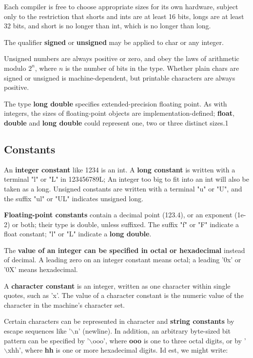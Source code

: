 \documentclass{article}
\begin{document}
Each compiler is free to choose appropriate sizes for its own hardware, subject only to the restriction that shorts and ints are at least 16 bits, longs are at least 32 bits, and short is no longer than int, which is no longer than long.

The qualifier \textbf{signed} or \textbf{unsigned} may be applied to char or any integer.

Unsigned numbers are always positive or zero, and obey the laws of arithmetic modulo $2^n$, where $n$ is the number of bits in the type. Whether plain chars are signed or unsigned is machine-dependent, but printable characters are always positive.

The type \textbf{long double} specifies extended-precision floating point. As with integers, the sizes of floating-point objects are implementation-defined; \textbf{float}, \textbf{double} and \textbf{long double} could represent one, two or three distinct sizes.1

\clearpage
\subsection{Constants}

An \textbf{integer constant} like 1234 is an int. 
A \textbf{long constant} is written with a terminal "l" or "L" in 123456789L; An integer too big to fit into an int will also be taken as a long. Unsigned constants are written with a terminal "u" or "U", and the suffix "ul" or "UL" indicates unsigned long.

\textbf{Floating-point constants} contain a decimal point (123.4), or an exponent (1e-2) or both; their type is double, unless suffixed. The suffix "f" or "F" indicate a float constant; "l" or "L" indicate a \textbf{long double}.

The \textbf{value of an integer can be specified in octal or hexadecimal} instead of decimal. A leading zero on an integer constant means octal; a leading '0x' or '0X' means hexadecimal.

A \textbf{character constant} is an integer, written as one character within single quotes, such as 'x'. The value of a character constant is the numeric value of the character in the machine's character set.

Certain characters can be represented in character and \textbf{string constants} by escape sequences like '$\backslash$n' (newline). In addition, an arbitrary byte-sized bit pattern can be specified by '$\backslash$ooo', where \textbf{ooo} is one to three octal digits, or by '$\backslash$xhh', where \textbf{hh} is one or more hexadecimal digits. Id est, we might write:
\end{document}
